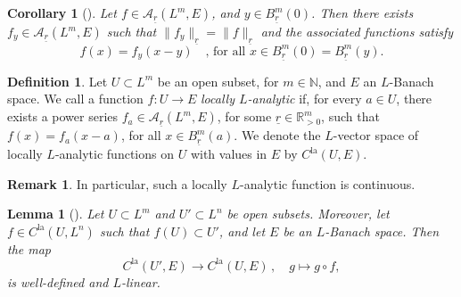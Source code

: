 \documentclass[a4paper, reqno, 10pt]{amsart}
\newtheorem{lemma}[theorem]{Lemma}
\newtheorem{corollary}[theorem]{Corollary}
\theoremstyle{definition}
\newtheorem{definition}[theorem]{Definition}
\newtheorem{remark}[theorem]{Remark}
\numberwithin{equation}{section}
\newcommand{\la}{{\mathrm{la}}}
\newcommand{\lra}{\longrightarrow}
\newcommand{\lto}{\longmapsto}
\newcommand{\norm}[1]{\lVert{#1}\rVert}
\newcommand{\ra}{\rightarrow}
\newcommand{\ul}[1]{{\underline{#1}}}
\newcommand{\BN}{{\mathbb {N}}}
\newcommand{\BR}{{\mathbb {R}}}
\newcommand{\CA}{{\mathcal {A}}}
\begin{document}
\begin{corollary}[{\cite[Cor.\ 5.5]{Schneider11pAdicLieGrps}}]\label{Cor 1 - Redevelopment of power series}
	Let $f\in \CA_\ul{r}(L^m,E)$, and $y\in B_\ul{r}^{m}(0)$.
	Then there exists $f_y \in \CA_\ul{r}(L^m, E)$ such that $\norm{f_y}_\ul{r} = \norm{f}_\ul{r}$ and the associated functions satisfy
	\begin{equation*}
		f(x) = f_y(x-y) \quad \text{, for all $x\in B_\ul{r}^{m}(0) = B_\ul{r}^{m}(y)$.}
	\end{equation*}
\end{corollary}


\begin{definition}\label{Def 1 - Locally analytic functions with values in Banach space}
	Let $U\subset L^m$ be an open subset, for $m\in \BN$, and $E$ an $L$-Banach space.
	We call a function $f \colon U \ra E$ \textit{locally $L$-analytic} if, for every $a \in U$, there exists a power series $f_{a}\in \CA_\ul{r}(L^m,E)$, for some $\ul{r}\in \BR_{>0}^m$, such that $f(x) = f_{a}(x-a)$, for all $x\in B_\ul{r}^{m}(a)$.
	We denote the $L$-vector space of locally $L$-analytic functions on $U$ with values in $E$ by $C^\la(U, E)$.
\end{definition}


\begin{remark}
	In particular, such a locally $L$-analytic function is continuous.
\end{remark}


\begin{lemma}[{\cite[Lemma 6.3]{Schneider11pAdicLieGrps}}]\label{Lemma 1 - Composition of locally analytic functions}
	Let $U\subset L^m$ and $U'\subset L^n$ be open subsets.
	Moreover, let $f\in C^\la(U,L^n)$ such that $f(U)\subset U'$, and let $E$ be an $L$-Banach space.
	Then the map
	\begin{equation*}
		C^\la(U',E) \lra C^\la(U,E) \,,\quad g \lto g\circ f ,
	\end{equation*}
	is well-defined and $L$-linear.
\end{lemma}
\end{document}
